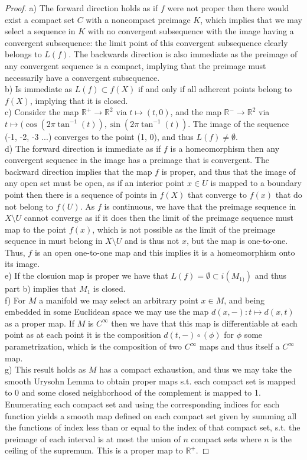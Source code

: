 \documentclass{article}
\begin{document}
\begin{proof}
  a) The forward direction holds as if $f$ were not proper then there would exist a compact set $C$ with a noncompact preimage $K$, which implies that we may select a sequence in $K$ with no convergent subsequence with the image having a convergent subsequence: the limit point of this convergent subsequence clearly belongs to $L(f)$. The backwards direction is also immediate as the preimage of any convergent sequence is a compact, implying that the preimage must necessarily have a convergent subsequence. \\
  b) Is immediate as $L(f) \subset f(X)$ if and only if all adherent points belong to $f(X)$, implying that it is closed. \\
  c) Consider the map $\mathbb{R}^{+} \to \mathbb{R}^{2}$ via $t \mapsto (t,0)$, and the map $\mathbb{R}^{-} \to \mathbb{R}^{2}$ via $t \mapsto (\cos(2\pi \tan^{-1}(t)), \sin(2\pi \tan^{-1}(t)) $. The image of the sequence (-1, -2, -3 ...) converges to the point (1, 0), and thus $L(f) \neq \emptyset$. \\
  d) The forward direction is immediate as if $f$ is a homeomorphism then any convergent sequence in the image has a preimage that is convergent. The backward direction implies that the map $f$ is proper, and thus that the image of any open set must be open, as if an interior point $x \in U$ is mapped to a boundary point then there is a sequence of points in $f(X)$ that converge to $f(x)$ that do not belong to $f(U)$. As $f$ is continuous, we have that the preimage sequence in $X \setminus U$ cannot converge as if it does then the limit of the preimage sequence must map to the point $f(x)$, which is not possible as the limit of the preimage sequence in must belong in $X \setminus U$ and is thus not $x$, but the map is one-to-one. Thus, $f$ is an open one-to-one map and this implies it is a homeomorphism onto its image. \\
  e) If the closuion map is proper we have that $L(f) = \emptyset \subset i(M_{1)})$ and thus part b) implies that $M_{1}$ is closed. \\
  f) For $M$ a manifold we may select an arbitrary point $x \in M$, and being embedded in some Euclidean space we may use the map $d(x, -) : t \mapsto d(x,t)$ as a proper map. If $M$ is $C^{\infty}$ then we have that this map is differentiable at each point as at each point it is the composition $d(t,-) \circ (\phi)$ for $\phi$ some parametrization, which is the composition of two $C^{\infty}$ maps and thus itself a $C^{\infty}$ map. \\
  g) This result holds as $M$ has a compact exhaustion, and thus we may take the smooth Urysohn Lemma to obtain proper maps s.t. each compact set is mapped to 0 and some closed neighborhood of the complement is mapped to 1. Enumerating each compact set and using the corresponding indices for each function yields a smooth map defined on each compact set given by summing all the functions of index less than or equal to the index of that compact set, s.t. the preimage of each interval is at most the union of $n$ compact sets where $n$ is the ceiling of the supremum. This is a proper map to $\mathbb{R}^{+}$. \end{proof}
\end{document}
